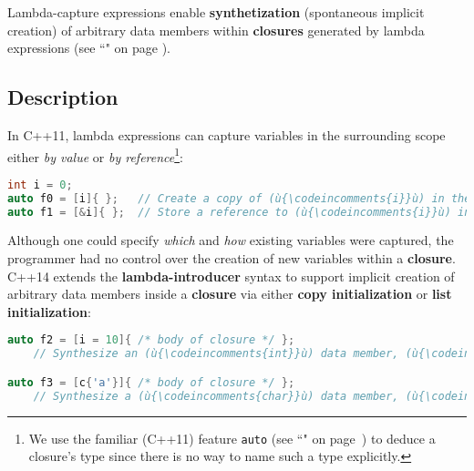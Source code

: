 

\setcounter{table}{0}
\setcounter{footnote}{0}
\setcounter{lstlisting}{0}

Lambda-capture expressions enable \textbf{synthetization} (spontaneous implicit creation) of
arbitrary data members within \textbf{closures} generated by
lambda expressions (see ``" on page \pageref{lambda}).

\subsection[Description]{Description}\label{description}

In C++11, lambda expressions can capture variables in the
surrounding scope either \emph{by value} or \emph{by reference}{\cprotect\footnote{We use the familiar (C++11) feature
  \texttt{auto} (see ``" on page~\pageref{auto-feature}) to deduce a closure's type since there is no
  way to name such a type explicitly.}}:

\begin{lstlisting}[language=C++]
int i = 0;
auto f0 = [i]{ };   // Create a copy of (ù{\codeincomments{i}}ù) in the generated closure named (ù{\codeincomments{f0}}ù).
auto f1 = [&i]{ };  // Store a reference to (ù{\codeincomments{i}}ù) in the generated closure named (ù{\codeincomments{f1}}ù).
\end{lstlisting}

\noindent Although one could specify \emph{which} and \emph{how} existing
variables were captured, the programmer had no control over the creation
of new variables within a \textbf{closure}. C++14 extends the
\textbf{lambda-introducer} syntax to support implicit creation of
arbitrary data members inside a \textbf{closure} via either \textbf{copy
initialization} or \textbf{list initialization}:

\begin{lstlisting}[language=C++]
auto f2 = [i = 10]{ /* body of closure */ };
    // Synthesize an (ù{\codeincomments{int}}ù) data member, (ù{\codeincomments{i}}ù), initialized with (ù{\codeincomments{10}}ù) in the closure.

auto f3 = [c{'a'}]{ /* body of closure */ };
    // Synthesize a (ù{\codeincomments{char}}ù) data member, (ù{\codeincomments{c}}ù), initialized with (ù{\codeincomments{'a'}}ù) in the closure.
\end{lstlisting}

